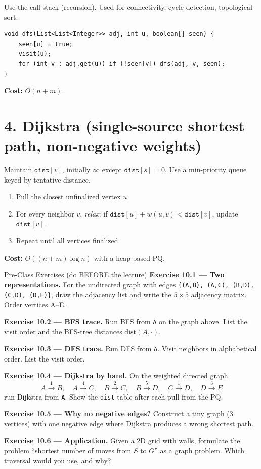 \documentclass[11pt]{article}
\begin{document}
Use the call stack (recursion). Used for connectivity, cycle detection, topological sort.

\begin{lstlisting}
void dfs(List<List<Integer>> adj, int u, boolean[] seen) {
    seen[u] = true;
    visit(u);
    for (int v : adj.get(u)) if (!seen[v]) dfs(adj, v, seen);
}
\end{lstlisting}

\textbf{Cost:} $O(n + m)$.

\section*{4. Dijkstra (single-source shortest path, non-negative weights)}

Maintain $\texttt{dist}[v]$, initially $\infty$ except $\texttt{dist}[s]=0$. Use a min-priority queue keyed by tentative distance.

\begin{enumerate}[leftmargin=*]
  \item Pull the closest unfinalized vertex $u$.
  \item For every neighbor $v$, \emph{relax}: if $\texttt{dist}[u] + w(u,v) < \texttt{dist}[v]$, update $\texttt{dist}[v]$.
  \item Repeat until all vertices finalized.
\end{enumerate}

\textbf{Cost:} $O((n+m)\log n)$ with a heap-based PQ.

\begin{exbox}{Pre-Class Exercises (do BEFORE the lecture)}
\textbf{Exercise 10.1 --- Two representations.} For the undirected graph with edges
\verb|{(A,B), (A,C), (B,D), (C,D), (D,E)}|, draw the adjacency list and write the $5\times 5$ adjacency matrix. Order vertices A--E.

\textbf{Exercise 10.2 --- BFS trace.} Run BFS from \texttt{A} on the graph above. List the visit order and the BFS-tree distances $\text{dist}(A, \cdot)$.

\textbf{Exercise 10.3 --- DFS trace.} Run DFS from \texttt{A}. Visit neighbors in alphabetical order. List the visit order.

\textbf{Exercise 10.4 --- Dijkstra by hand.} On the weighted directed graph
\[
A\xrightarrow{1}B,\quad A\xrightarrow{4}C,\quad B\xrightarrow{2}C,\quad B\xrightarrow{5}D,\quad C\xrightarrow{1}D,\quad D\xrightarrow{3}E
\]
run Dijkstra from \texttt{A}. Show the \texttt{dist} table after each pull from the PQ.

\textbf{Exercise 10.5 --- Why no negative edges?} Construct a tiny graph (3 vertices) with one negative edge where Dijkstra produces a wrong shortest path.

\textbf{Exercise 10.6 --- Application.} Given a 2D grid with walls, formulate the problem ``shortest number of moves from $S$ to $G$'' as a graph problem. Which traversal would you use, and why?
\end{exbox}
\end{document}
